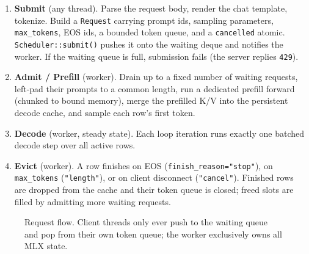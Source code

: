 \documentclass[11pt,a4paper]{report}
\newcommand{\code}[1]{\texttt{#1}}
\begin{document}
\begin{enumerate}[nosep]
  \item \textbf{Submit} (any thread). Parse the request body, render the chat
        template, tokenize. Build a \code{Request} carrying prompt ids, sampling
        parameters, \code{max\_tokens}, EOS ids, a bounded token queue, and a
        \code{cancelled} atomic. \code{Scheduler::submit()} pushes it onto the
        waiting deque and notifies the worker. If the waiting queue is full,
        submission fails (the server replies \code{429}).
  \item \textbf{Admit / Prefill} (worker). Drain up to a fixed number of waiting
        requests, left-pad their prompts to a common length, run a dedicated
        prefill forward (chunked to bound memory), merge the prefilled K/V into the
        persistent decode cache, and sample each row's first token.
  \item \textbf{Decode} (worker, steady state). Each loop iteration runs exactly
        one batched decode step over all active rows.
  \item \textbf{Evict} (worker). A row finishes on EOS
        (\code{finish\_reason="stop"}), on \code{max\_tokens}
        (\code{"length"}), or on client disconnect (\code{"cancel"}). Finished
        rows are dropped from the cache and their token queue is closed; freed
        slots are filled by admitting more waiting requests.
\end{enumerate}

\begin{figure}[t]
\centering
{}
\caption{Request flow. Client threads only ever push to the waiting queue and pop
from their own token queue; the worker exclusively owns all MLX state.}
\label{fig:flow}
\end{figure}
\end{document}
